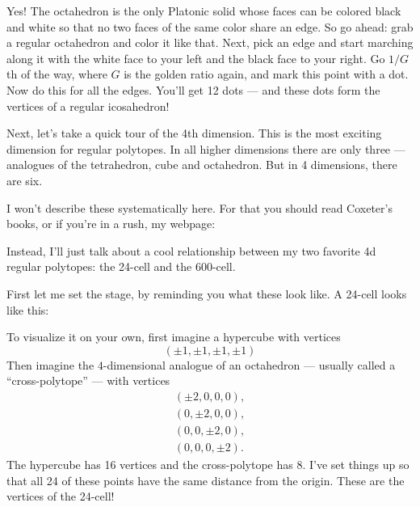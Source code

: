 \documentclass{article}
\def\tightlist{}
\renewcommand{\texttt}[1]{%
  \begingroup
  \ttfamily
  \begingroup\lccode`~=`/\lowercase{\endgroup\def~}{/\discretionary{}{}{}}%
  \begingroup\lccode`~=`[\lowercase{\endgroup\def~}{[\discretionary{}{}{}}%
  \begingroup\lccode`~=`.\lowercase{\endgroup\def~}{.\discretionary{}{}{}}%
  \catcode`/=\active\catcode`[=\active\catcode`.=\active
  \scantokens{#1\noexpand}%
  \endgroup
}
\begin{document}
Yes! The octahedron is the only Platonic solid whose faces can be
colored black and white so that no two faces of the same color share an
edge. So go ahead: grab a regular octahedron and color it like that.
Next, pick an edge and start marching along it with the white face to
your left and the black face to your right. Go \(1/G\)th of the way,
where \(G\) is the golden ratio again, and mark this point with a dot.
Now do this for all the edges. You'll get 12 dots --- and these dots
form the vertices of a regular icosahedron!

Next, let's take a quick tour of the 4th dimension. This is the most
exciting dimension for regular polytopes. In all higher dimensions there
are only three --- analogues of the tetrahedron, cube and octahedron.
But in 4 dimensions, there are six.

I won't describe these systematically here. For that you should read
Coxeter's books, or if you're in a rush, my webpage:


Instead, I'll just talk about a cool relationship between my two
favorite 4d regular polytopes: the 24-cell and the 600-cell.

First let me set the stage, by reminding you what these look like. A
24-cell looks like this:


To visualize it on your own, first imagine a hypercube with vertices
\[(\pm1,\pm1,\pm1,\pm1)\] Then imagine the \(4\)-dimensional analogue of
an octahedron --- usually called a ``cross-polytope'' --- with vertices
\[
  \begin{gathered}
    (\pm2,0,0,0),
  \\(0,\pm2,0,0),
  \\(0,0,\pm2,0),
  \\(0,0,0,\pm2).
  \end{gathered}
\] The hypercube has 16 vertices and the cross-polytope has 8. I've set
things up so that all 24 of these points have the same distance from the
origin. These are the vertices of the 24-cell!
\end{document}
